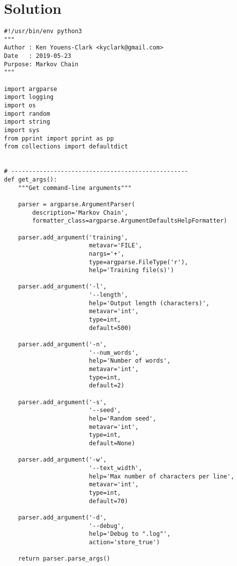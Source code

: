 \documentclass[]{article}
\begin{document}
\pagebreak

\hypertarget{solution-24}{%
\section{Solution}\label{solution-24}}

\begin{verbatim}
#!/usr/bin/env python3
"""
Author : Ken Youens-Clark <kyclark@gmail.com>
Date   : 2019-05-23
Purpose: Markov Chain
"""

import argparse
import logging
import os
import random
import string
import sys
from pprint import pprint as pp
from collections import defaultdict


# --------------------------------------------------
def get_args():
    """Get command-line arguments"""

    parser = argparse.ArgumentParser(
        description='Markov Chain',
        formatter_class=argparse.ArgumentDefaultsHelpFormatter)

    parser.add_argument('training',
                        metavar='FILE',
                        nargs='+',
                        type=argparse.FileType('r'),
                        help='Training file(s)')

    parser.add_argument('-l',
                        '--length',
                        help='Output length (characters)',
                        metavar='int',
                        type=int,
                        default=500)

    parser.add_argument('-n',
                        '--num_words',
                        help='Number of words',
                        metavar='int',
                        type=int,
                        default=2)

    parser.add_argument('-s',
                        '--seed',
                        help='Random seed',
                        metavar='int',
                        type=int,
                        default=None)

    parser.add_argument('-w',
                        '--text_width',
                        help='Max number of characters per line',
                        metavar='int',
                        type=int,
                        default=70)

    parser.add_argument('-d',
                        '--debug',
                        help='Debug to ".log"',
                        action='store_true')

    return parser.parse_args()



\end{verbatim}
\end{document}
